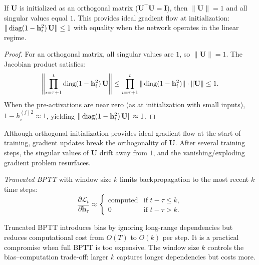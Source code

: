 \documentclass[11pt,a4paper]{article}
\begin{document}
\begin{proposition}
\label{prop:orthogonal}
If $\mathbf{U}$ is initialized as an orthogonal matrix
($\mathbf{U}^\top \mathbf{U} = \mathbf{I}$), then
$\|\mathbf{U}\| = 1$ and all singular values equal $1$.  This
provides ideal gradient flow at initialization:
$\|\operatorname{diag}(1 - \mathbf{h}_i^2) \, \mathbf{U}\| \leq 1$ with
equality when the network operates in the linear regime.
\end{proposition}

\begin{proof}
For an orthogonal matrix, all singular values are $1$, so
$\|\mathbf{U}\| = 1$.  The Jacobian product satisfies:
\[
  \left\|\prod_{i=\tau+1}^{t} \operatorname{diag}(1 - \mathbf{h}_i^2)\,
    \mathbf{U}\right\| \leq \prod_{i=\tau+1}^{t}
    \|\operatorname{diag}(1 - \mathbf{h}_i^2)\| \cdot \|\mathbf{U}\|
    \leq 1.
\]
When the pre-activations are near zero (as at initialization with
small inputs), $1 - h_i^{(j)2} \approx 1$, yielding
$\|\operatorname{diag}(1 - \mathbf{h}_i^2) \, \mathbf{U}\| \approx 1$.
\end{proof}

\begin{warning}[title={Orthogonality is Not Preserved}]
Although orthogonal initialization provides ideal gradient flow at
the start of training, gradient updates break the orthogonality
of $\mathbf{U}$.  After several training steps, the singular values
of $\mathbf{U}$ drift away from $1$, and the vanishing/exploding
gradient problem resurfaces.
\end{warning}

\begin{definition}
\label{def:truncated-bptt}
\emph{Truncated BPTT} with window size $k$ limits backpropagation to
the most recent $k$ time steps:
\begin{equation}
  \frac{\partial \mathcal{L}_t}{\partial \mathbf{h}_\tau}
    \approx \begin{cases}
      \text{computed} & \text{if } t - \tau \leq k, \\
      0 & \text{if } t - \tau > k.
    \end{cases}
  \label{eq:truncated-bptt}
\end{equation}
\end{definition}

\begin{remark}
Truncated BPTT introduces bias by ignoring long-range dependencies
but reduces computational cost from $O(T)$ to $O(k)$ per step.  It
is a practical compromise when full BPTT is too expensive.  The
window size $k$ controls the bias--computation trade-off: larger $k$
captures longer dependencies but costs more.
\end{remark}
\end{document}
